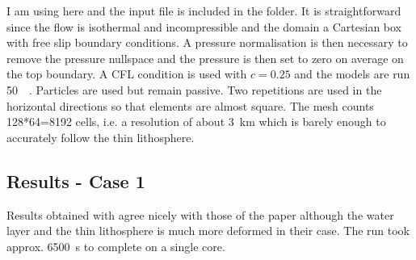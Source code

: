 I am using here \aspect and the input file is included in the folder. It is straightforward 
since the flow is isothermal and incompressible and the domain a Cartesian box with 
free slip boundary conditions. A pressure normalisation is then necessary to remove 
the pressure nullspace and the pressure is then set to zero on average on the top boundary. 
A CFL condition is used with $c=0.25$ and the models 
are run 50~\si{\mega\year}. Particles are used but remain passive. 
Two repetitions are used in the horizontal directions so that elements are almost square.
The mesh counts 128*64=8192 cells, i.e. a resolution of about 3~\si{\km} which is barely enough to 
accurately follow the thin lithosphere.


\subsection*{Results - Case 1}

Results obtained with \aspect agree nicely with those of the paper
although the water layer and the thin lithosphere is much more 
deformed in their case. The run took approx. 6500~s to complete on a single core.

